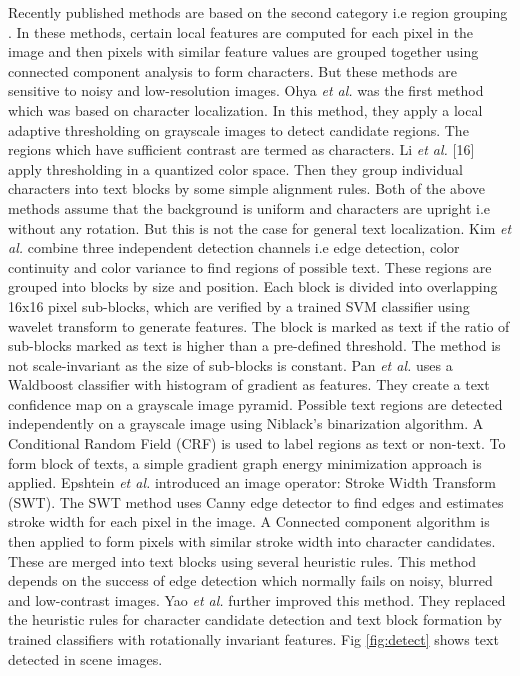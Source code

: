 Recently published methods are based on the second category i.e region grouping 
\cite{chap2-7, chap2-8, chap2-10, chap2-11, chap2-12}.
In these methods, certain local features are computed for each pixel in the image and
then pixels with similar feature values are grouped together using connected
component analysis to form characters. 
But these methods are sensitive to noisy and low-resolution
images.
Ohya {\em et al.} \cite{chap2-6} was the first method which was based on character localization. 
In this method, they apply a local adaptive thresholding on grayscale 
images to detect candidate regions. The regions which have sufficient
contrast are termed as characters. Li {\em et al.} [16] \cite{chap2-13} apply thresholding in a
quantized color space. Then they group individual characters into text blocks
by some simple alignment rules. Both of the above methods assume that the 
background is uniform and characters are upright i.e
without any rotation. But this is not the case for general
text localization.
Kim {\em et al.}\cite{chap2-14} combine three independent detection channels i.e edge detection, 
color continuity and color variance
to find regions of possible text. These
regions are grouped into blocks by size and position. Each
block is divided into overlapping 16x16 pixel sub-blocks, which are
verified by a trained SVM classifier using wavelet transform to generate
features. The block is marked as text if the ratio of sub-blocks marked as text is higher than a pre-defined
threshold. The method is not scale-invariant as
the size of sub-blocks is constant.
Pan {\em et al.} \cite{chap2-7} 
uses a Waldboost classifier with histogram of gradient
as features. They create a text confidence map on a grayscale image pyramid.
Possible text regions are detected independently on a grayscale image using 
Niblack's binarization algorithm. A Conditional Random Field (CRF) is used
to label regions as
text or non-text.
To form block of texts, a simple gradient graph energy minimization approach is applied. 
Epshtein {\em et al.} \cite{chap2-11}
introduced an image operator: Stroke Width Transform (SWT). The SWT 
method uses Canny edge detector to find edges
and estimates stroke width for each pixel in the image.
A Connected component algorithm is then applied to form pixels with similar
stroke width into character candidates. These are merged into text blocks
using several heuristic rules. This method depends on the success of edge detection
which normally fails on noisy, blurred and low-contrast images.
Yao {\em et al.}\cite{chap2-8}
further improved this method. They replaced the
heuristic rules for character candidate detection and text block
formation by  trained classifiers with rotationally invariant features.
Fig \ref{fig:detect} shows text detected in scene images.

